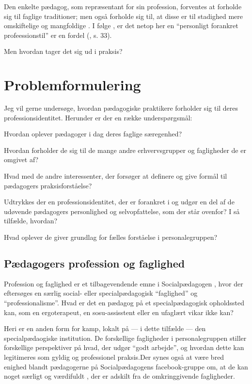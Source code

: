 Den enkelte pædagog, som repræsentant for sin profession, forventes at forholde sig til faglige traditioner; men også forholde sig til, at disse er til stadighed mere omskiftelige og mangfoldige \autocite{hansbolKonstruktionAfProfessionel2008}. I følge \citeauthor{hansbolKonstruktionAfProfessionel2008}, er det netop her en “personligt forankret profeessionstil” er en fordel (\citeyear{hansbolKonstruktionAfProfessionel2008}, s. 33).


Men hvordan tager det sig ud i praksis?

\section{Problemformulering}
Jeg vil gerne undersøge, hvordan pædagogiske praktikere forholder sig til deres professionsidentitet.
Herunder er der en række underspørgsmål:

Hvordan oplever pædagoger i dag deres faglige særegenhed?

Hvordan forholder de sig til de mange andre erhvervsgrupper og fagligheder de er omgivet af?

Hvad med de andre interessenter, der forsøger at definere og give formål til pædagogers praksisforståelse?

Udtrykkes der en professionsidentitet, der er forankret i og udgør en del af de udøvende pædagogers personlighed og selvopfattelse, som der står ovenfor?
I så tilfælde, hvordan?

Hvad oplever de giver grundlag for fælles forståelse i personalegruppen?

\subsection{Pædagogers profession og faglighed}
Profession og faglighed er et tilbagevendende emne i Socialpædagogen \autocite[fx]{petersenHvadSigerEksperten2019}, hvor der eftersøges en særlig social- eller specialpædagogisk “faglighed” og “professionalisme”.
Hvad er det en pædagog på et specialpædagogisk opholdssted kan, som en ergoterapeut, en sosu-assisstent eller en ufaglært vikar ikke kan?

Heri er en anden form for kamp, lokalt på — i dette tilfælde — den specialpædaogiske institution.
De forskellige fagligheder i personalegruppen stiller forskellige perspektiver på hvad, der udgør “godt arbejde”, og hvordan dette kan legitimeres som gyldig og professionel praksis.Der synes også at være bred enighed blandt pædagogerne på Socialpædagogens facebook-gruppe om, at de kan noget særligt og værdifuldt \autocite{petersenSlagsMenneskeligAltmuligmand2019}, der er adskilt fra de omkringgivende fagligheder.

